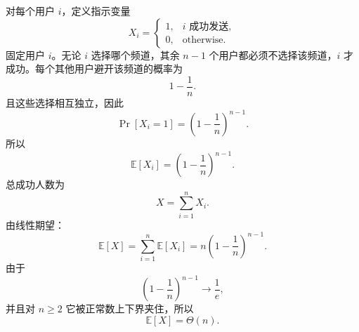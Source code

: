\documentclass[UTF8,a4paper,11pt]{ctexart}
\begin{document}
对每个用户 $i$，定义指示变量
\[
X_i=
\begin{cases}
1, & i\text{ 成功发送},\\
0, & \text{otherwise}.
\end{cases}
\]
固定用户 $i$。无论 $i$ 选择哪个频道，其余 $n-1$ 个用户都必须不选择该频道，$i$ 才成功。每个其他用户避开该频道的概率为
\[
1-\frac1n.
\]
且这些选择相互独立，因此
\[
\Pr[X_i=1]=\left(1-\frac1n\right)^{n-1}.
\]
所以
\[
\mathbb E[X_i]=\left(1-\frac1n\right)^{n-1}.
\]
总成功人数为
\[
X=\sum_{i=1}^n X_i.
\]
由线性期望：
\[
\mathbb E[X]=\sum_{i=1}^n\mathbb E[X_i]
=n\left(1-\frac1n\right)^{n-1}.
\]
由于
\[
\left(1-\frac1n\right)^{n-1}\to \frac1e,
\]
并且对 $n\ge2$ 它被正常数上下界夹住，所以
\[
\mathbb E[X]=\Theta(n).
\]
\end{document}
